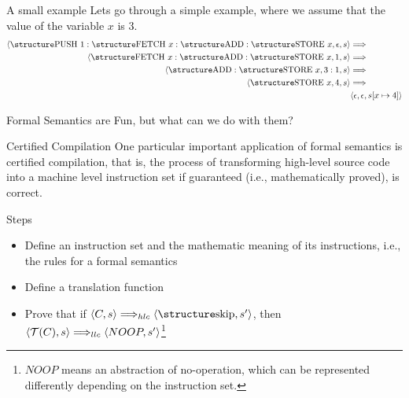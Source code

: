 \documentclass[aspectratio=169]{beamer}
\begin{document}
\begin{slide}{A small example}
Lets go through a simple example, where we assume that the value of the variable $x$ is 3.
\begin{align*}
\pair{\kw{PUSH}~1:\kw{FETCH}~x:\kw{ADD}:\kw{STORE}~x,\epsilon,s} & \Longrightarrow \\ 
\pair{\kw{FETCH}~x:\kw{ADD}:\kw{STORE}~x,1,s} & \Longrightarrow \\ 
\pair{\kw{ADD}:\kw{STORE}~x,3:1,s} & \Longrightarrow \\ 
\pair{\kw{STORE}~x,4,s} & \Longrightarrow \\ 
& \pair{\epsilon,\epsilon,s[x \mapsto 4]} \\ 
\end{align*}
\end{slide}

\begin{slide}{Formal Semantics are Fun, but what can we do with them?}

\begin{block}{Certified Compilation}
One particular important application of formal semantics is certified compilation, that is, the process of transforming high-level source code into a machine level instruction set if guaranteed (i.e., mathematically proved), is correct.
\end{block}

\begin{block}{Steps}
\begin{itemize}
  \item Define an instruction set and the mathematic meaning of its instructions, i.e., the rules for a formal semantics
  \item Define a translation function
  \item Prove that if $\pair{C,s} \Longrightarrow_{hlc} \pair{\kw{skip},s'}$, then $\mathopen{\langle}\mathcal{T}(C),s\mathclose{\rangle} \Longrightarrow_{llc} \mathopen{\langle}NOOP,s'\mathclose{\rangle}$\footnote{$NOOP$ means an abstraction of no-operation, which can be represented differently depending on the instruction set.}
\end{itemize}  
\end{block}
\end{slide}
\end{document}
